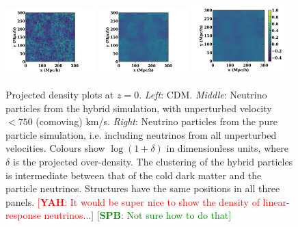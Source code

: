 \documentclass[useAMS, usenatbib]{mnras}
\newcommand{\spb}[1]{{\textcolor{green}{[{\bf SPB}: #1]}}}
\newcommand{\yah}[1]{{\textcolor{red}{[{\bf YAH}: #1]}}}
\begin{document}
\begin{figure}
\includegraphics[trim={1.cm 0 1.5cm 0},clip,width=0.31\textwidth]{nuplots/dens-plt-b300p512nu0_4hybt1.pdf}
\includegraphics[trim={1cm 0 1.5cm 0},clip, width=0.31\textwidth]{nuplots/dens-plt-b300p512nu0_4hybt2.pdf}
\includegraphics[trim={1.5cm 0 0.5cm 0},clip, width=0.322\textwidth]{nuplots/dens-plt-b300p512nu0_4pt2.pdf}
  \caption{Projected density plots at $z=0$. \emph{Left}: CDM. \emph{Middle}: Neutrino particles from the hybrid simulation, with unperturbed velocity $<750$ (comoving) km/s. \emph{Right}: Neutrino particles from the pure particle simulation, i.e. including neutrinos from all unperturbed velocities. Colours show $\log (1+ \delta)$ in dimensionless units, where $\delta$ is the projected over-density.
  The clustering of the hybrid particles is intermediate between that of the cold dark matter and the particle neutrinos. Structures have the same positions in all three panels. \yah{It would be super nice to show the density of linear-response neutrinos...} \spb{Not sure how to do that}}
  \label{fig:density_plot}
\end{figure}
\end{document}
